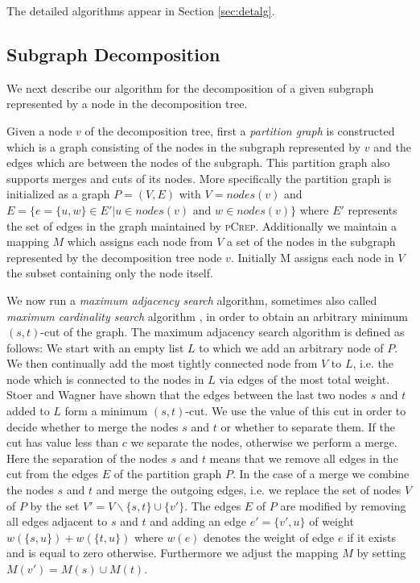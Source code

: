 \documentclass[a4paper,UKenglish,cleveref, autoref, thm-restate,authorcolumns]{lipics-v2019}
\newcommand{\adjDel}{\textsc{pCrep}}
\begin{document}

The detailed algorithms appear in Section
\ref{sec:detalg}.

\subsection{Subgraph Decomposition}
\label{decomp_desc}

We next describe our algorithm for the decomposition of a given subgraph represented by a node in the decomposition tree. 

Given a node $v$ of the decomposition tree, first a \textit{partition graph} is constructed which is a graph consisting of the nodes in the subgraph represented by $v$ and the edges which are between the nodes of the subgraph. This partition graph also supports merges and cuts of its nodes. More specifically the partition graph is initialized as a graph $P=(V,E)$ with $V=nodes(v)$ and $E=\{e=\{u,w\}\in E'|u\in nodes(v)\text{ and }w\in nodes(v)\}$ where $E'$ represents the set of edges in the graph maintained by \adjDel{}. Additionally we maintain a mapping $M$ which assigns each node from $V$ a set of the nodes in the subgraph represented by the decomposition tree node $v$. Initially M assigns each node in $V$ the subset containing only the node itself.

We now run a \textit{maximum adjacency search} algorithm, sometimes also called \textit{maximum cardinality search} algorithm \cite{Stoer1997}, in order to obtain an arbitrary minimum $(s,t)$-cut of the graph.
The maximum adjacency search algorithm is defined as follows: We start with an empty list $L$ to which we add an arbitrary node of $P$. We then continually add the most tightly connected node from $V$ to $L$, i.e. the node which is connected to the nodes in $L$ via edges of the most total weight. Stoer and Wagner \cite{Stoer1997} have shown that the edges between the last two nodes $s$ and $t$ added to $L$ form a minimum $(s,t)$-cut.
We use the value of this cut in order to decide whether to merge the nodes $s$ and $t$ or whether to separate them. If the cut has value less than $c$ we separate the nodes, otherwise we perform a merge.
Here the separation of the nodes $s$ and $t$ means that we remove all edges in the cut from the edges $E$ of the partition graph $P$.
In the case of a merge we combine the nodes $s$ and $t$ and merge the outgoing edges, i.e. we replace the set of nodes $V$ of $P$ by the set $V'=V\backslash\{s,t\}\cup\{v'\}$. The edges $E$ of $P$ are modified by removing all edges adjacent to $s$ and $t$ and adding an edge $e'=\{v',u\}$ of weight $w(\{s,u\})+w(\{t,u\})$ where $w(e)$ denotes the weight of edge $e$ if it exists and is equal to zero otherwise.
Furthermore we adjust the mapping $M$ by setting $M(v')=M(s)\cup M(t)$.
\end{document}
